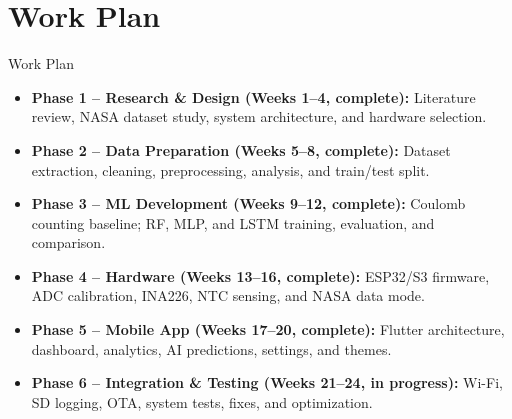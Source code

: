\documentclass[10pt,aspectratio=43]{beamer}
\begin{document}
\section{Work Plan}
\begin{frame}{Work Plan}
  \footnotesize
  \begin{itemize}
    \setlength{\itemsep}{6pt}
    \item \textbf{Phase 1 -- Research \& Design (Weeks 1--4, complete):} Literature review, NASA dataset study, system architecture, and hardware selection.
    \item \textbf{Phase 2 -- Data Preparation (Weeks 5--8, complete):} Dataset extraction, cleaning, preprocessing, analysis, and train/test split.
    \item \textbf{Phase 3 -- ML Development (Weeks 9--12, complete):} Coulomb counting baseline; RF, MLP, and LSTM training, evaluation, and comparison.
    \item \textbf{Phase 4 -- Hardware (Weeks 13--16, complete):} ESP32/S3 firmware, ADC calibration, INA226, NTC sensing, and NASA data mode.
    \item \textbf{Phase 5 -- Mobile App (Weeks 17--20, complete):} Flutter architecture, dashboard, analytics, AI predictions, settings, and themes.
    \item \textbf{Phase 6 -- Integration \& Testing (Weeks 21--24, in progress):} Wi-Fi, SD logging, OTA, system tests, fixes, and optimization.
  \end{itemize}
\end{frame}
\end{document}
